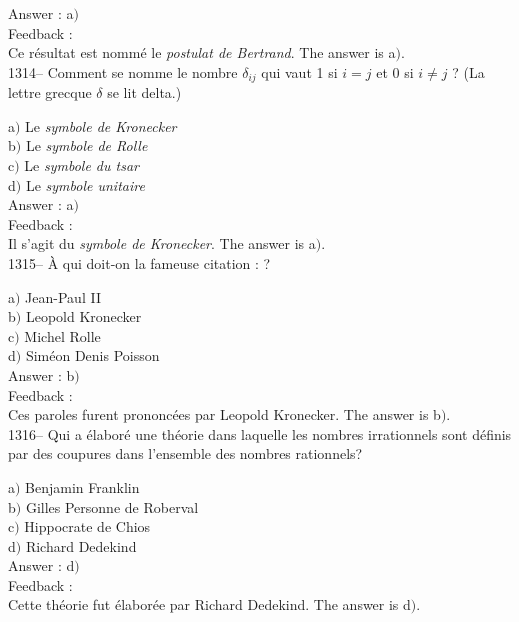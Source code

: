 ﻿\documentclass[letterpaper, 12pt]{article}
\begin{document}
Answer : a$)$\\

Feedback : \\
Ce r\'esultat est nomm\'e le {\sl postulat de Bertrand}.
The answer is  a$)$.\\


1314-- Comment se nomme le nombre $\delta_{ij}$ qui vaut 1 si $i=j$
et 0 si $i\not=j$ ? (La lettre grecque $\delta$ se lit delta.)

a$)$ Le {\sl symbole de Kronecker} \\
b$)$ Le {\sl symbole de Rolle} \\
c$)$ Le {\sl symbole du tsar}  \\
d$)$ Le {\sl symbole unitaire}\\

Answer : a$)$\\

Feedback : \\
Il s'agit du {\sl symbole de Kronecker}.
The answer is  a$)$.\\

1315-- \`A qui doit-on la fameuse citation : \fg ?

a$)$ Jean-Paul II \\
b$)$ Leopold Kronecker \\
c$)$ Michel Rolle  \\
d$)$ Sim\'eon Denis Poisson\\

Answer : b$)$\\

Feedback : \\
Ces paroles furent prononc\'ees par Leopold Kronecker.
The answer is  b$)$.\\

1316-- Qui a \'elabor\'e une th\'eorie dans laquelle les nombres
irrationnels sont d\'efinis par des coupures dans l'ensemble des
nombres rationnels?

a$)$ Benjamin Franklin \\
b$)$ Gilles Personne de Roberval \\
c$)$ Hippocrate de Chios \\
d$)$ Richard Dedekind\\

Answer : d$)$\\

Feedback : \\
Cette th\'eorie fut \'elabor\'ee par Richard Dedekind.
The answer is  d$)$.\\
\end{document}
